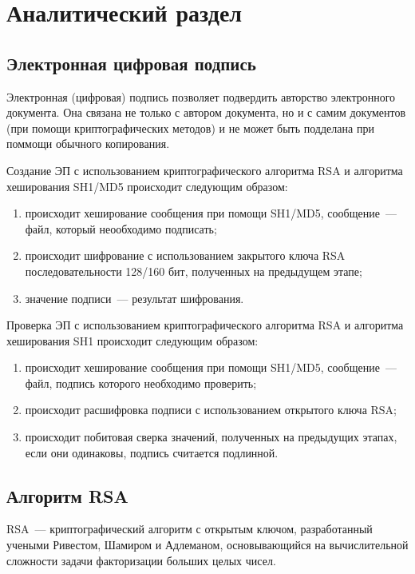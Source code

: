 \chapter{Аналитический раздел}

\section{Электронная цифровая подпись}

Электронная (цифровая) подпись позволяет подвердить авторство электронного документа. Она связана не только с автором документа, но и с самим документов (при помощи криптографических методов) и не может быть подделана при поммощи обычного копирования.

Создание ЭП с использованием криптографического алгоритма RSA и алгоритма хеширования SH1/MD5 происходит следующим образом:
\begin{enumerate}
	\item происходит хеширование сообщения при помощи SH1/MD5, сообщение~--- файл, который неообходимо подписать;
	\item происходит шифрование с использованием закрытого ключа RSA последовательности 128/160 бит, полученных на предыдущем этапе;
	\item значение подписи~--- результат шифрования.
\end{enumerate}

Проверка ЭП с использованием криптографического алгоритма RSA и алгоритма хеширования SH1 происходит следующим образом:
\begin{enumerate}
	\item происходит хеширование сообщения при помощи SH1/MD5, сообщение~--- файл, подпись которого необходимо проверить;
	\item происходит расшифровка
	подписи с использованием открытого ключа RSA;
	\item происходит побитовая сверка значений, полученных на предыдущих этапах, если они одинаковы, подпись считается подлинной.
\end{enumerate}


\section{Алгоритм RSA}

RSA~--- криптографический алгоритм с открытым ключом, разработанный учеными Ривестом, Шамиром и Адлеманом, основывающийся на вычислительной сложности задачи факторизации больших целых чисел.

